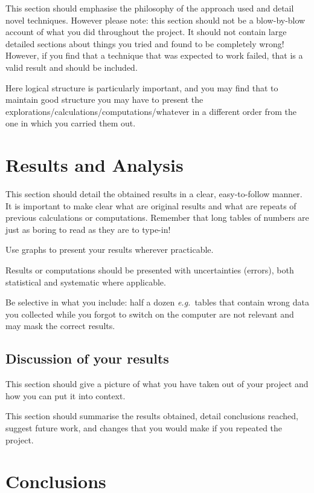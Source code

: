 \documentclass[12pt,a4paper]{report}
\begin{document}
This section should emphasise the philosophy of the approach used and
detail novel techniques. However please note: this section should not
be a blow-by-blow account of what you did throughout the project. It
should not contain large detailed sections about things you tried and
found to be completely wrong! However, if you find that a technique
that was expected to work failed, that is a valid result and should be
included.

Here logical structure is particularly important, and you may find
that to maintain good structure you may have to present the
explorations/calculations/computations/whatever in a different order
from the one in which you carried them out.


\chapter{Results and Analysis}

This section should detail the obtained results in a clear,
easy-to-follow manner. It is important to make clear what are original
results and what are repeats of previous calculations or computations.
Remember that long tables of numbers are just as boring to read as
they are to type-in!

Use graphs to present your results wherever practicable.

Results or computations should be presented with uncertainties
(errors), both statistical and systematic where applicable.

Be selective in what you include: half a dozen \emph{e.g.}~tables that
contain wrong data you collected while you forgot to switch on the
computer are not relevant and may mask the correct results.

\section{Discussion of your results}

This section should give a picture of what you have taken out of your
project and how you can put it into context.

This section should summarise the results obtained, detail conclusions
reached, suggest future work, and changes that you would make if you
repeated the project.

\chapter{Conclusions}
\end{document}
